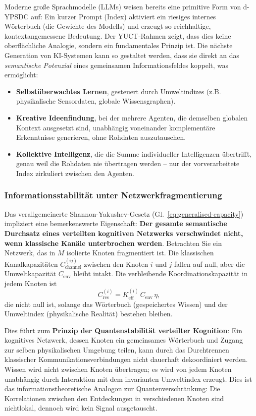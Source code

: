 \documentclass[12pt,a4paper]{article}
\theoremstyle{remark}
\begin{document}
	Moderne große Sprachmodelle (LLMs) weisen bereits eine primitive Form von d-YPSDC auf: Ein kurzer Prompt (Index) aktiviert ein riesiges internes Wörterbuch (die Gewichte des Modells) und erzeugt so reichhaltige, kontextangemessene Bedeutung. Der YUCT-Rahmen zeigt, dass dies keine oberflächliche Analogie, sondern ein fundamentales Prinzip ist. Die nächste Generation von KI-Systemen kann so gestaltet werden, dass sie direkt an das \emph{semantische Potenzial} eines gemeinsamen Informationsfeldes koppelt, was ermöglicht:
	\begin{itemize}
		\item \textbf{Selbstüberwachtes Lernen}, gesteuert durch Umweltindizes (z.B. physikalische Sensordaten, globale Wissensgraphen).
		\item \textbf{Kreative Ideenfindung}, bei der mehrere Agenten, die demselben globalen Kontext ausgesetzt sind, unabhängig voneinander komplementäre Erkenntnisse generieren, ohne Rohdaten auszutauschen.
		\item \textbf{Kollektive Intelligenz}, die die Summe individueller Intelligenzen übertrifft, genau weil die Rohdaten nie übertragen werden – nur der vorverarbeitete Index zirkuliert zwischen den Agenten.
	\end{itemize}
	
	\subsubsection{Informationsstabilität unter Netzwerkfragmentierung}
	\label{subsubsec:info-stability-fragmentation}
	
	Das verallgemeinerte Shannon-Yakushev-Gesetz (Gl.~\ref{eq:generalised-capacity}) impliziert eine bemerkenswerte Eigenschaft: \textbf{Der gesamte semantische Durchsatz eines verteilten kognitiven Netzwerks verschwindet nicht, wenn klassische Kanäle unterbrochen werden}. Betrachten Sie ein Netzwerk, das in \(M\) isolierte Knoten fragmentiert ist. Die klassischen Kanalkapazitäten \(C_{\mathrm{channel}}^{(ij)}\) zwischen den Knoten \(i\) und \(j\) fallen auf null, aber die Umweltkapazität \(C_{\mathrm{env}}\) bleibt intakt. Die verbleibende Koordinationskapazität in jedem Knoten ist
	\[
	C_{\mathrm{res}}^{(i)} = K_{\mathrm{eff}}^{(i)} \, C_{\mathrm{env}} \, \eta,
	\]
	die nicht null ist, solange das Wörterbuch (gespeichertes Wissen) und der Umweltindex (physikalische Realität) bestehen bleiben.
	
	Dies führt zum \textbf{Prinzip der Quantenstabilität verteilter Kognition}: Ein kognitives Netzwerk, dessen Knoten ein gemeinsames Wörterbuch und Zugang zur selben physikalischen Umgebung teilen, kann durch das Durchtrennen klassischer Kommunikationsverbindungen nicht dauerhaft dekoordiniert werden. Wissen wird nicht zwischen Knoten übertragen; es wird von jedem Knoten unabhängig durch Interaktion mit dem invarianten Umweltindex erzeugt. Dies ist das informationstheoretische Analogon zur Quantenverschränkung: Die Korrelationen zwischen den Entdeckungen in verschiedenen Knoten sind nichtlokal, dennoch wird kein Signal ausgetauscht.
	
\end{document}
